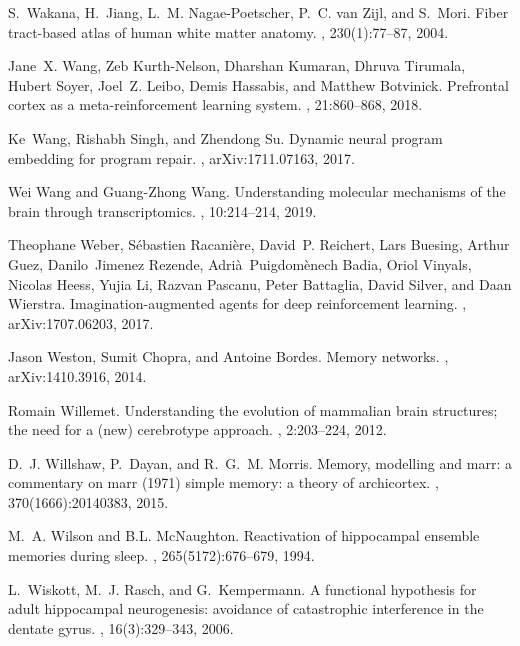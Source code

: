 \documentclass[letterpaper,11pt]{article}
\begin{document}
\begin{thebibliography}{100}
S.~Wakana, H.~Jiang, L.~M. Nagae-Poetscher, P.~C. van Zijl, and S.~Mori.
\newblock Fiber tract-based atlas of human white matter anatomy.
, 230(1):77--87, 2004.

Jane~X. Wang, Zeb Kurth-Nelson, Dharshan Kumaran, Dhruva Tirumala, Hubert
  Soyer, Joel~Z. Leibo, Demis Hassabis, and Matthew Botvinick.
\newblock Prefrontal cortex as a meta-reinforcement learning system.
, 21:860--868, 2018.

Ke~Wang, Rishabh Singh, and Zhendong Su.
\newblock Dynamic neural program embedding for program repair.
, arXiv:1711.07163, 2017.

Wei Wang and Guang-Zhong Wang.
\newblock Understanding molecular mechanisms of the brain through
  transcriptomics.
, 10:214--214, 2019.

Theophane Weber, S{\'{e}}bastien Racani{\`{e}}re, David~P. Reichert, Lars
  Buesing, Arthur Guez, Danilo~Jimenez Rezende, Adri{\`{a}}~Puigdom{\`{e}}nech
  Badia, Oriol Vinyals, Nicolas Heess, Yujia Li, Razvan Pascanu, Peter
  Battaglia, David Silver, and Daan Wierstra.
\newblock Imagination-augmented agents for deep reinforcement learning.
, arXiv:1707.06203, 2017.

Jason Weston, Sumit Chopra, and Antoine Bordes.
\newblock Memory networks.
, arXiv:1410.3916, 2014.

Romain Willemet.
\newblock Understanding the evolution of mammalian brain structures; the need
  for a (new) cerebrotype approach.
, 2:203--224, 2012.

D.~J. Willshaw, P.~Dayan, and R.~G.~M. Morris.
\newblock Memory, modelling and marr: a commentary on marr (1971) simple
  memory: a theory of archicortex.
, 370(1666):20140383, 2015.

M.~A. Wilson and B.L. McNaughton.
\newblock Reactivation of hippocampal ensemble memories during sleep.
, 265(5172):676--679, 1994.

L.~Wiskott, M.~J. Rasch, and G.~Kempermann.
\newblock A functional hypothesis for adult hippocampal neurogenesis: avoidance
  of catastrophic interference in the dentate gyrus.
, 16(3):329--343, 2006.


\end{thebibliography}
\end{document}
